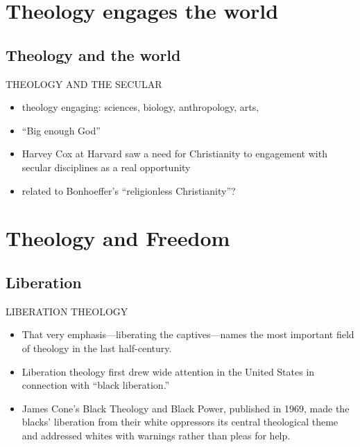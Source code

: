 \section{Theology engages the world}
\label{sec-4}
\subsection{Theology and the world}
\label{sec-4-1}
\begin{frame}[label=sec-4-1-1]{THEOLOGY AND THE SECULAR}
\begin{itemize}
\item theology engaging: sciences, biology, anthropology, arts,
\item ``Big enough God''
\item Harvey Cox at Harvard saw a need for Christianity to engagement with secular disciplines as a real opportunity
\item related to Bonhoeffer's ``religionless Christianity''?
\end{itemize}
\end{frame}
\section{Theology and Freedom}
\label{sec-5}
\subsection{Liberation}
\label{sec-5-1}
\begin{frame}[label=sec-5-1-1]{LIBERATION THEOLOGY}
\begin{itemize}
\item That very emphasis—liberating the captives—names the most important field of theology in the last half-century.
\item Liberation theology first drew wide attention in the United States in connection with “black liberation.”
\item James Cone’s Black Theology and Black Power, published in 1969, made the blacks’ liberation from their white oppressors its central theological theme and addressed whites with warnings rather than pleas for help.
\end{itemize}
\end{frame}

